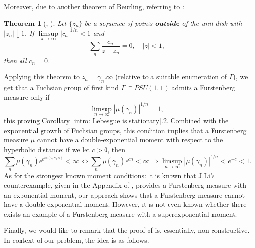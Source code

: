 \documentclass[11pt]{article}
\newtheorem{theorem}{Theorem}[section]
\begin{document}
Moreover, due to another theorem of Beurling, referring to \cite[Corollary 4.2.24]{Shapiro1968}:

\begin{theorem}[\cite{beurling1934fonctions}, \cite{beurling1989collected}]
	Let $\{ z_n \}$ be a sequence of points \textbf{outside} of the unit disk with $|z_n| \downarrow 1$. If $\limsup\limits_{n \rightarrow \infty} |c_n|^{1/n} < 1$ and
	\[
	\sum_n \frac{c_n}{z - z_n} = 0, \quad |z| < 1,
	\]
	then all $c_n = 0$.
\end{theorem}
Applying this theorem to $z_n = \gamma_n.\infty$ (relative to a suitable enumeration of $\Gamma$), we get that a Fuchsian group of first kind $\Gamma \subset PSU(1,1)$ admits a Furstenberg measure only if
\[
\limsup\limits_{n \rightarrow \infty} |\mu(\gamma_n)|^{1/n} = 1,
\] 
this proving Corollary \ref{intro: Lebesgue is stationary}.2. Combined with the exponential growth of Fuchsian groups, this condition implies that a Furstenberg measure $\mu$ cannot have a double-exponential moment with respect to the hyperbolic distance: if we let $c > 0$, then
\[
\sum_{n} \mu(\gamma_n) e^{e^{c d(0, \gamma_n.0)}} < \infty \iff \sum_{n} \mu(\gamma_n) e^{c n} < \infty \Rightarrow \limsup\limits_{n \rightarrow \infty} |\mu(\gamma_n)|^{1/n} < e^{-c} < 1.
\]
As for the strongest known moment conditions: it is known that J.Li's counterexample, given in the Appendix of \cite{10.1215/00127094-2020-0058}, provides a Furstenberg measure with an exponential moment, our approach shows that a Furstenberg measure cannot have a double-exponential moment. However, it is not even known whether there exists an example of a Furstenberg measure with a superexponential moment. 

Finally, we would like to remark that the proof of \cite[Theorem 3]{brownsums} is, essentially, non-constructive. In context of our problem, the idea is as follows.
\end{document}
